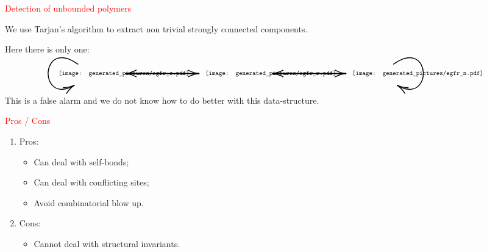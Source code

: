 \documentclass[landscape,20pt]{transparents2e}
\newcommand{\red}{\textcolor{red}}
\renewcommand{\frametitle}[1]{\red{\HUGE #1 }}
\begin{document}
\begin{slide}{\frametitle{Detection of unbounded polymers}}

\vfill

We use Tarjan's algorithm to extract non trivial strongly connected components.

\vfill

Here there is only one:

\begin{equation*}\hspace*{1cm}\scalebox{2.5}{\xymatrix@C=0.5cm@R=0.35cm{\begin{minipage}{1cm}\scalebox{0.3}{\texttt{[image: generated\_pictures/egfr\_c.pdf]}}\end{minipage}
  \ar@{->}[rr]
  \ar@{->}@(ul,dl)
  &&
\begin{minipage}{1cm}\scalebox{0.3}{\texttt{[image: generated\_pictures/egfr\_r.pdf]}}\end{minipage}
  \ar@{->}[ll]
  \ar@{->}[rr]&&
\begin{minipage}{1cm}\scalebox{0.3}{\texttt{[image: generated\_pictures/egfr\_n.pdf]}}\end{minipage}
  \ar@{->}[ll]
  \ar@{->}@(ur,dr)&&}}\end{equation*}

\vfill

This is a false alarm and we do not know how to do better with this data-structure.

\vfill

\end{slide}

\begin{slide}{\frametitle{Pros / Cons}}

\vfill

\begin{enumerate}
\item Pros:
  \begin{itemize}
    \item Can deal with self-bonds;
    \item Can deal with conflicting sites;
    \item Avoid combinatorial blow up.
  \end{itemize}
\vfill
\item Cons:
  \begin{itemize}
    \item Cannot deal with structural invariants.
  \end{itemize}

  \vfill\mbox{}
\end{enumerate}
\end{slide}
\end{document}
